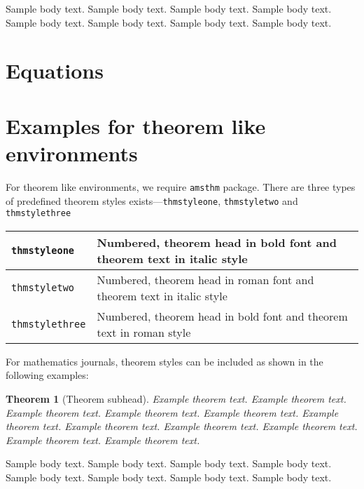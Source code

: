 \documentclass[sn-mathphys]{sn-jnl}%
\theoremstyle{thmstyleone}%
\newtheorem{theorem}{Theorem}%
\theoremstyle{thmstyletwo}%
\theoremstyle{thmstylethree}%
\begin{document}
Sample body text. Sample body text. Sample body text. Sample body text. Sample body text. Sample body text. Sample body text. Sample body text. 

\section{Equations}\label{sec4}



\section{Examples for theorem like environments}\label{sec10}

For theorem like environments, we require \verb+amsthm+ package. There are three types of predefined theorem styles exists---\verb+thmstyleone+, \verb+thmstyletwo+ and \verb+thmstylethree+ 

\bigskip
\begin{tabular}{|l|p{19pc}|}
\hline
\verb+thmstyleone+ & Numbered, theorem head in bold font and theorem text in italic style \\\hline
\verb+thmstyletwo+ & Numbered, theorem head in roman font and theorem text in italic style \\\hline
\verb+thmstylethree+ & Numbered, theorem head in bold font and theorem text in roman style \\\hline
\end{tabular}
\bigskip

For mathematics journals, theorem styles can be included as shown in the following examples:

\begin{theorem}[Theorem subhead]\label{thm1}
Example theorem text. Example theorem text. Example theorem text. Example theorem text. Example theorem text. 
Example theorem text. Example theorem text. Example theorem text. Example theorem text. Example theorem text. 
Example theorem text. 
\end{theorem}

Sample body text. Sample body text. Sample body text. Sample body text. Sample body text. Sample body text. Sample body text. Sample body text.
\end{document}

